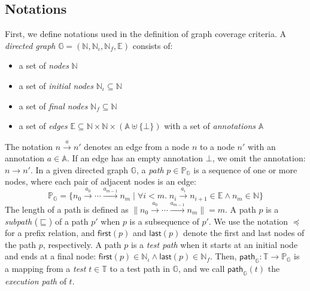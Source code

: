 \documentclass[acmsmall,review,screen]{acmart}
\newcommand{\name}[1]{\textsf{#1}}
\newcommand{\graph}{\mathbb{G}}
\newcommand{\nodeset}{\mathbb{N}}
\newcommand{\node}{n}
\newcommand{\inodeset}{\nodeset_\iota}
\newcommand{\fnodeset}{\nodeset_f}
\newcommand{\edgeset}{\mathbb{E}}
\newcommand{\edge}[1]{\xrightarrow{#1}}
\newcommand{\annotset}{\mathbb{A}}
\newcommand{\annot}{a}
\newcommand{\patset}[1]{\mathbb{P}_{#1}}
\newcommand{\pat}{p}
\newcommand{\patmap}[1]{\name{path}_{#1}}
\newcommand{\getfirst}{\name{first}}
\newcommand{\getlast}{\name{last}}
\newcommand{\testset}{\mathbb{T}}
\newcommand{\test}{t}
\newcommand{\prefix}{\preceq}
\newcommand{\subpath}{\sqsubseteq}
\newcommand{\norm}[1]{\lVert{#1}\rVert}
\begin{document}


\subsection{Notations}\label{sec:notation}
%
First, we define notations used in the definition of graph coverage criteria.
%
A \textit{directed graph} $\graph = (\nodeset, \inodeset,
\fnodeset, \edgeset)$ consists of:
\begin{itemize}
  \item a set of \textit{nodes} $\nodeset$
  \item a set of \textit{initial nodes} $\inodeset \subseteq \nodeset$
  \item a set of \textit{final nodes} $\fnodeset \subseteq \nodeset$
  \item a set of \textit{edges} $\edgeset \subseteq \nodeset \times \nodeset
    \times (\annotset \uplus \{ \bot \})$ with a set of \textit{annotations}
    $\annotset$
\end{itemize}
%
The notation $\node \edge{\annot} \node'$ denotes an edge from a node $\node$ to
a node $\node'$ with an annotation $\annot \in \annotset$.
%
If an edge has an empty annotation $\bot$, we omit the annotation: $\node
\edge{} \node'$.
%
In a given directed graph $\graph$, a \textit{path} $\pat \in \patset{\graph}$
is a sequence of one or more nodes, where each pair of adjacent nodes is an
edge:
\begin{equation}\label{euq:path-def}
  \patset{\graph} = \{
    \node_0 \edge{\annot_0} \cdots \edge{\annot_{m-1}} \node_m \mid
    \forall i < m. \; \node_i \edge{\annot_i} \node_{i+1} \in \edgeset \wedge
    \node_m \in \nodeset
  \}
\end{equation}
%
The length of a path is defined as $\norm{\node_0 \edge{\annot_0} \cdots
\edge{\annot_{m-1}} \node_m} = m$.
%
A path $\pat$ is a \textit{subpath} ($\subpath$) of a path $\pat'$ when $\pat$
is a subsequence of $\pat'$.
%
We use the notation $\prefix$ for a prefix relation, and $\getfirst(\pat)$ and
$\getlast(\pat)$ denote the first and last nodes of the path $\pat$,
respectively.
%
A path $\pat$ is a \textit{test path} when it starts at an initial node and ends
at a final node: $\getfirst(\pat) \in \inodeset \wedge \getlast(\pat) \in
\fnodeset$.
%
Then, $\patmap{\graph} : \testset \rightarrow \patset{\graph}$ is a mapping from
a \textit{test} $\test \in \testset$ to a test path in $\graph$, and we call
$\patmap{\graph}(\test)$ the \textit{execution path} of $\test$.
\end{document}
